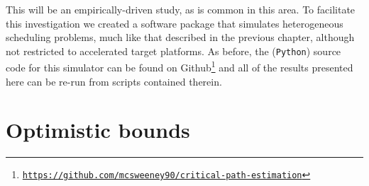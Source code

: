 \documentclass[12pt]{article}
\begin{document}
This will be an empirically-driven study, as is common in this area. To facilitate this investigation we created a software package that simulates heterogeneous scheduling problems, much like that described in the previous chapter, although not restricted to accelerated target platforms. As before, the ({\tt Python}) source code for this simulator can be found on Github\footnote{\href{https://github.com/mcsweeney90/critical-path-estimation}{{\tt \small https://github.com/mcsweeney90/critical-path-estimation}}} and all of the results presented here can be re-run from scripts contained therein. 



\section{Optimistic bounds}
\label{sect.optimistic}
\end{document}
